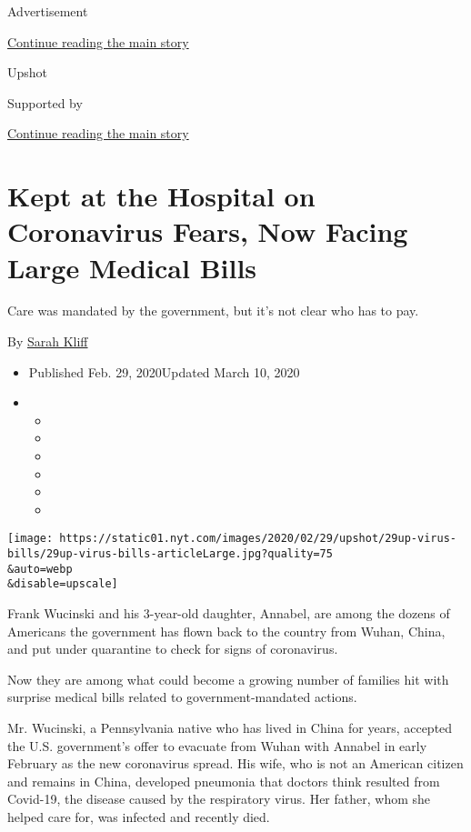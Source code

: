 Advertisement

\protect\hyperlink{after-top}{Continue reading the main story}

Upshot

Supported by

\protect\hyperlink{after-sponsor}{Continue reading the main story}

\hypertarget{kept-at-the-hospital-on-coronavirus-fears-now-facing-large-medical-bills}{%
\section{Kept at the Hospital on Coronavirus Fears, Now Facing Large
Medical
Bills}\label{kept-at-the-hospital-on-coronavirus-fears-now-facing-large-medical-bills}}

Care was mandated by the government, but it's not clear who has to pay.

By \href{https://www.nytimes.com/by/sarah-kliff}{Sarah Kliff}

\begin{itemize}
\item
  Published Feb. 29, 2020Updated March 10, 2020
\item
  \begin{itemize}
  \item
  \item
  \item
  \item
  \item
  \item
  \end{itemize}
\end{itemize}

\texttt{[image: https://static01.nyt.com/images/2020/02/29/upshot/29up-virus-bills/29up-virus-bills-articleLarge.jpg?quality=75\\\&auto=webp\\\&disable=upscale]}

Frank Wucinski and his 3-year-old daughter, Annabel, are among the
dozens of Americans the government has flown back to the country from
Wuhan, China, and put under quarantine to check for signs of
coronavirus.

Now they are among what could become a growing number of families hit
with surprise medical bills related to government-mandated actions.

Mr. Wucinski, a Pennsylvania native who has lived in China for years,
accepted the U.S. government's offer to evacuate from Wuhan with Annabel
in early February as the new coronavirus spread. His wife, who is not an
American citizen and remains in China, developed pneumonia that doctors
think resulted from Covid-19, the disease caused by the respiratory
virus. Her father, whom she helped care for, was infected and recently
died.

